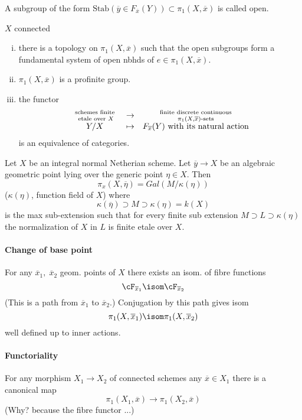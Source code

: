 \begin{defi}A subgroup of the form $\text{Stab}(\overline y\in F_{\overline x}(Y))\subset \pi_1(X, \overline x)$ is called open.
\end{defi}

\begin{thm} $X$ connected
	\begin{enumerate}[(i)]
	\item there is a topology on $\pi_1(X, \overline x)$ such that the open subgroups form a fundamental system of open nbhds of $e\in \pi_1(X, \overline x)$.
	\item $\pi_1(X, \overline x)$ is a profinite group.
	\item the functor 
		$$\begin{array}{cccccc}
		\text{ schemes finite }\atop \text{ etale over }X & \to & \text{ finite discrete continuous }\atop \pi_1(X, \overline x)\text{-sets}\\
		Y /  X& \mapsto & F_{\overline x}(Y) \text{ with its natural action}
		\end{array}$$
		is an equivalence of categories. 
	\end{enumerate}
\end{thm}

\begin{prop} Let $X$ be an integral normal Netherian scheme. Let $\overline y\to X$ be an algebraic geometric point lying over the generic point $\eta\in X$. Then
	$$\pi_x(X, \overline \eta) = Gal(M/\kappa(\eta))$$
	($\kappa(\eta)$, function field of $X$) where
	$$\kappa(\overline \eta)\supset M\supset \kappa(\eta) = k(X)$$
	is the max sub-extension such that for every finite sub extension $M\supset L\supset \kappa(\eta)$ the normalization of $X$ in $L$ is finite etale over $X$. 
\end{prop}

\paragraph{Change of base point} For any $\overline x_1, \; \overline x_2$  geom. points of $X$ there exists an isom. of fibre functions
	$$\cF_{\overline x_1} \isom \cF_{\overline x_2}$$
	(This is a path from $\overline x_1$ to $\overline x_2$.) Conjugation by this path gives isom
		$$\pi_1(X, \overline x_1) \isom \pi_1(X, \overline x_2)$$
		well defined up to inner actions. 

\paragraph{Functoriality} For any morphism $X_1\to X_2$ of connected schemes any $\overline x\in X_1$ there is a canonical map
	$$\pi_1(X_1, \overline x) \to \pi_1(X_2, \overline x)$$
(Why? because the fibre functor ...)

